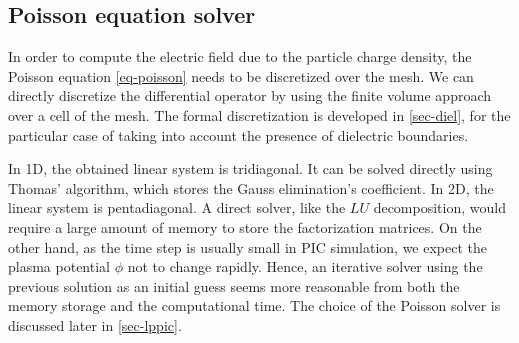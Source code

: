   \subsection{Poisson equation solver}
  \label{subsec-poissonintro}

    In order to compute the electric field due to the particle charge density, the Poisson equation \cref{eq-poisson}  needs to be discretized over the mesh.
    We can directly discretize the differential operator by using the finite volume approach over a cell of the mesh.
    The formal discretization is developed in \cref{sec-diel}, for the particular case of taking into account the presence of dielectric boundaries.

    In \ac{1D}, the obtained linear system is tridiagonal.
    It can be solved directly using {\sc Thomas}' algorithm, which stores the Gauss elimination's coefficient.
    In \ac{2D}, the linear system is pentadiagonal.
    A direct solver, like the $LU$ decomposition, would require a large amount of memory to store the factorization matrices.
    On the other hand, as the time step is usually small in \ac{PIC} simulation, we expect the plasma potential $\phi$ not to change rapidly.
    Hence, an iterative solver using the previous solution as an initial guess seems more reasonable from both the memory storage and the computational time.
    The choice of the Poisson solver is discussed later in \cref{sec-lppic}.
    

    